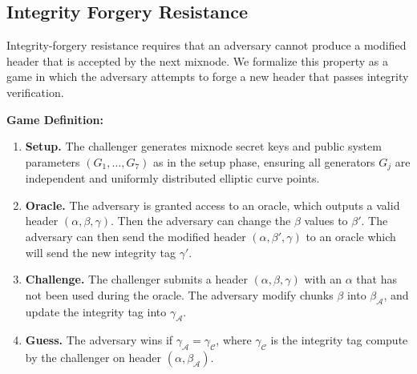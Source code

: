 
\subsection{Integrity Forgery Resistance}\label{sec:integrity_forgery}


Integrity-forgery resistance requires that an adversary cannot produce a modified header that is accepted by the next mixnode.  
We formalize this property as a game in which the adversary attempts to forge a new header that passes integrity verification.
\newline

\noindent\textbf{Game Definition:}
\begin{enumerate}
\item \textbf{Setup.}
  The challenger generates mixnode secret keys and public system parameters $(G_1, \dots, G_7)$ as in the setup phase, ensuring all generators $G_j$ are independent and uniformly distributed elliptic curve points.

  \item \textbf{Oracle.}  
  The adversary is granted access to an oracle, which outputs a valid header $(\alpha, \beta, \gamma)$.
  Then the adversary can change the $\beta$ values to $\beta'$.
  The adversary can then send the modified header $(\alpha, \beta', \gamma)$ to an oracle which will send the new integrity tag $\gamma'$.

  \item \textbf{Challenge.}
  The challenger submits a header $(\alpha, \beta, \gamma)$ with an $\alpha$ that has not been used during the oracle.
  The adversary modify chunks $\beta$ into $\beta_\mathcal{A}$, and update the integrity tag into $\gamma_\mathcal{A}$.

  \item \textbf{Guess.}
  The adversary wins if $\gamma_\mathcal{A} = \gamma_\mathcal{C}$, where $\gamma_\mathcal{C}$ is the integrity tag compute by the challenger on header $(\alpha, \beta_\mathcal{A})$.
\end{enumerate}


